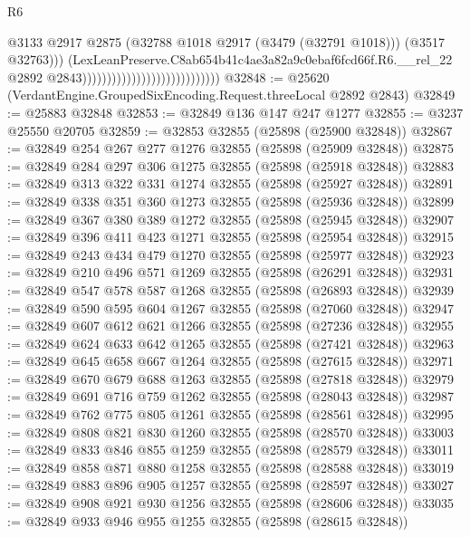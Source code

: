 \begin{lexlean}{R6}
\begin{coremodule}
                                                              @3133
                                                              @2917
                                                              @2875
                                                              (@32788
                                                                @1018
                                                                @2917
                                                                (@3479 (@32791 @1018)))
                                                              (@3517 @32763)))
                                                          (LexLeanPreserve.C8ab654b41c4ae3a82a9c0ebaf6fcd66f.R6.__rel_22
                                                            @2892
                                                            @2843))))))))))))))))))))))))))))
@32848 := @25620 (VerdantEngine.GroupedSixEncoding.Request.threeLocal @2892 @2843)
@32849 := @25883 @32848
@32853 := @32849 @136 @147 @247 @1277
@32855 := @3237 @25550 @20705
@32859 := @32853 @32855 (@25898 (@25900 @32848))
@32867 := @32849 @254 @267 @277 @1276 @32855 (@25898 (@25909 @32848))
@32875 := @32849 @284 @297 @306 @1275 @32855 (@25898 (@25918 @32848))
@32883 := @32849 @313 @322 @331 @1274 @32855 (@25898 (@25927 @32848))
@32891 := @32849 @338 @351 @360 @1273 @32855 (@25898 (@25936 @32848))
@32899 := @32849 @367 @380 @389 @1272 @32855 (@25898 (@25945 @32848))
@32907 := @32849 @396 @411 @423 @1271 @32855 (@25898 (@25954 @32848))
@32915 := @32849 @243 @434 @479 @1270 @32855 (@25898 (@25977 @32848))
@32923 := @32849 @210 @496 @571 @1269 @32855 (@25898 (@26291 @32848))
@32931 := @32849 @547 @578 @587 @1268 @32855 (@25898 (@26893 @32848))
@32939 := @32849 @590 @595 @604 @1267 @32855 (@25898 (@27060 @32848))
@32947 := @32849 @607 @612 @621 @1266 @32855 (@25898 (@27236 @32848))
@32955 := @32849 @624 @633 @642 @1265 @32855 (@25898 (@27421 @32848))
@32963 := @32849 @645 @658 @667 @1264 @32855 (@25898 (@27615 @32848))
@32971 := @32849 @670 @679 @688 @1263 @32855 (@25898 (@27818 @32848))
@32979 := @32849 @691 @716 @759 @1262 @32855 (@25898 (@28043 @32848))
@32987 := @32849 @762 @775 @805 @1261 @32855 (@25898 (@28561 @32848))
@32995 := @32849 @808 @821 @830 @1260 @32855 (@25898 (@28570 @32848))
@33003 := @32849 @833 @846 @855 @1259 @32855 (@25898 (@28579 @32848))
@33011 := @32849 @858 @871 @880 @1258 @32855 (@25898 (@28588 @32848))
@33019 := @32849 @883 @896 @905 @1257 @32855 (@25898 (@28597 @32848))
@33027 := @32849 @908 @921 @930 @1256 @32855 (@25898 (@28606 @32848))
@33035 := @32849 @933 @946 @955 @1255 @32855 (@25898 (@28615 @32848))

\end{coremodule}
\end{lexlean}
